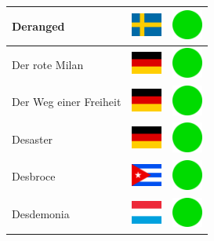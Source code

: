 \documentclass[12pt, a4paper, twoside]{report}
\begin{document}
\begin{center}
\begin{longtable}{|p{5cm}|p{2cm}|p{2cm}|}
 Deranged                                                   & \includegraphics[width=1cm]{../4x3/se} &   \includegraphics[width=1cm]{../likes/y} \\ \hline
 Der rote Milan                                             & \includegraphics[width=1cm]{../4x3/de} &   \includegraphics[width=1cm]{../likes/y} \\ \hline
 Der Weg einer Freiheit                                     & \includegraphics[width=1cm]{../4x3/de} &   \includegraphics[width=1cm]{../likes/y} \\ \hline
 Desaster                                                   & \includegraphics[width=1cm]{../4x3/de} &   \includegraphics[width=1cm]{../likes/y} \\ \hline
 Desbroce                                                   & \includegraphics[width=1cm]{../4x3/cu} &   \includegraphics[width=1cm]{../likes/y} \\ \hline
 Desdemonia                                                 & \includegraphics[width=1cm]{../4x3/lu} &   \includegraphics[width=1cm]{../likes/y} \\ \hline

\end{longtable}
\end{center}
\end{document}
